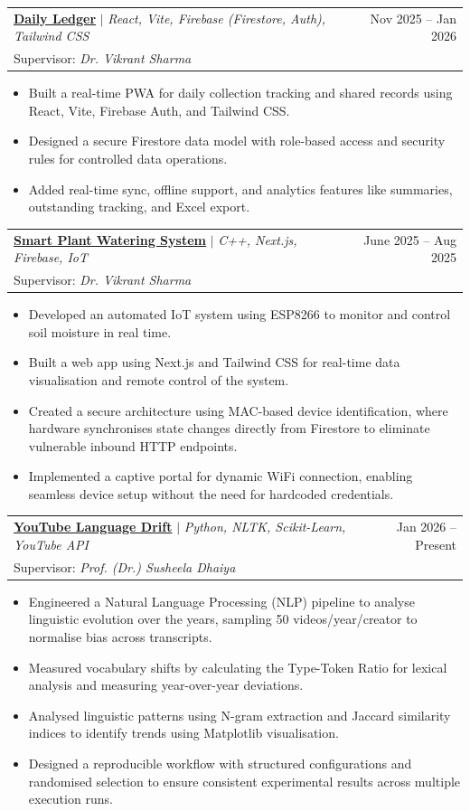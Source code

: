 \documentclass[letterpaper,11pt]{article}
\makeatletter
\newcommand{\resumeItem}[1]{
  \item\small{
    {#1 \vspace{-2pt}}
  }
}
\newcommand{\resumeProjectHeadingGuide}[3]{
    \item
    \begin{tabular*}{0.97\textwidth}{l@{\extracolsep{\fill}}r}
      \small#1 & #2 \\
      \small{Supervisor: \textit{#3}} & \\
    \end{tabular*}\vspace{-7pt}
}
\newcommand{\resumeItemListStart}{\begin{itemize}}
\newcommand{\resumeItemListEnd}{\end{itemize}\vspace{-5pt}}
\makeatother
\begin{document}
      \resumeProjectHeadingGuide
          {\href{https://github.com/190-785/Interactive-Resume-Maker}{\textbf{Daily Ledger}} $|$ \emph{React, Vite, Firebase (Firestore, Auth), Tailwind CSS}}{Nov 2025 -- Jan 2026}
          {Dr. Vikrant Sharma}
          \resumeItemListStart
            \resumeItem{Built a real-time PWA for daily collection tracking and shared records using React, Vite, Firebase Auth, and Tailwind CSS.}
            \resumeItem{Designed a secure Firestore data model with role-based access and security rules for controlled data operations.}
            \resumeItem{Added real-time sync, offline support, and analytics features like summaries, outstanding tracking, and Excel export.}
          \resumeItemListEnd

             \resumeProjectHeadingGuide
          {\href{https://github.com/190-785/Plant_Watering_System}{\textbf{Smart Plant Watering System}} $|$ \emph{C++, Next.js, Firebase, IoT}}{June 2025 -- Aug 2025}
          {Dr. Vikrant Sharma}
          \resumeItemListStart
            \resumeItem{Developed an automated IoT system using ESP8266 to monitor and control soil moisture in real time.}
            \resumeItem{Built a web app using Next.js and Tailwind CSS for real-time data visualisation and remote control of the system.}
            \resumeItem{Created a secure architecture using MAC-based device identification, where hardware synchronises state changes directly from Firestore to eliminate vulnerable inbound HTTP endpoints.}
            \resumeItem{Implemented a captive portal for dynamic WiFi connection, enabling seamless device setup without the need for hardcoded credentials.}
          \resumeItemListEnd
          
      \resumeProjectHeadingGuide
          {\href{https://github.com/190-785/youtube-language-drift}{\textbf{YouTube Language Drift}} $|$ \emph{Python, NLTK, Scikit-Learn, YouTube API}}{Jan 2026 -- Present}
          {Prof. (Dr.) Susheela Dhaiya}
          \resumeItemListStart
            \resumeItem{Engineered a Natural Language Processing (NLP) pipeline to analyse linguistic evolution over the years, sampling 50 videos/year/creator to normalise bias across transcripts. }
            \resumeItem{Measured vocabulary shifts by calculating the Type-Token Ratio for lexical analysis and measuring year-over-year deviations.}
            \resumeItem{Analysed linguistic patterns using N-gram extraction and Jaccard similarity indices to identify trends using Matplotlib visualisation.}
            \resumeItem{Designed a reproducible workflow with structured configurations and randomised selection to ensure consistent experimental results across multiple execution runs.}
          \resumeItemListEnd
          
\end{document}
